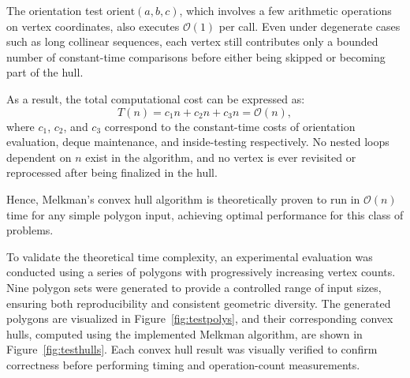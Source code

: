\documentclass{article}
\begin{document}
The orientation test $\text{orient}(a,b,c)$, which involves a few arithmetic operations on vertex coordinates, also executes $\mathcal{O}(1)$ per call. 
Even under degenerate cases such as long collinear sequences, each vertex still contributes only a bounded number of constant-time comparisons before either being skipped or becoming part of the hull.

As a result, the total computational cost can be expressed as:
\[
T(n) = c_1 n + c_2 n + c_3 n = \mathcal{O}(n),
\]
where $c_1$, $c_2$, and $c_3$ correspond to the constant-time costs of orientation evaluation, deque maintenance, and inside-testing respectively. 
No nested loops dependent on $n$ exist in the algorithm, and no vertex is ever revisited or reprocessed after being finalized in the hull. 

Hence, Melkman’s convex hull algorithm is theoretically proven to run in $\mathcal{O}(n)$ time for any simple polygon input, achieving optimal performance for this class of problems.


To validate the theoretical time complexity, an experimental evaluation was conducted using a series of polygons with progressively increasing vertex counts. 
Nine polygon sets were generated to provide a controlled range of input sizes, ensuring both reproducibility and consistent geometric diversity. 
The generated polygons are visualized in Figure~\ref{fig:testpolys}, and their corresponding convex hulls, computed using the implemented Melkman algorithm, are shown in Figure~\ref{fig:testhulls}. 
Each convex hull result was visually verified to confirm correctness before performing timing and operation-count measurements.
\end{document}
